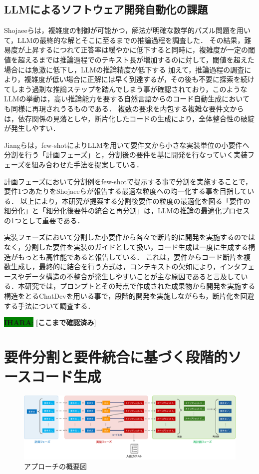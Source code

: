 \documentclass[submit,techrep,noauthor]{ipsj}
\newcommand{\ihara}[1]{\colorbox{green}{{\bf IHARA}:}{\color{blue} {\textbf{[#1]}}}}
\begin{document}
\subsection{LLMによるソフトウェア開発自動化の課題}
Shojaeeら\cite{IllusionApple}は，複雑度の制御が可能かつ，解法が明確な数学的パズル問題を用いて，LLMの最終的な解とそこに至るまでの推論過程を調査した．
その結果，難易度が上昇するにつれて正答率は緩やかに低下すると同時に，複雑度が一定の閾値を超えるまでは推論過程でのテキスト長が増加するのに対して，閾値を超えた場合には急激に低下し，LLMの推論精度が低下する
加えて，推論過程の調査により，複雑度が低い場合に正解には早く到達するが，その後も不要に探索を続けてしまう過剰な推論ステップを踏んでしまう事が確認されており，このようなLLMの挙動は，高い推論能力を要する自然言語からのコード自動生成においても同様に再現されうるものである．
複数の要求を内包する複雑な要件文からは，依存関係の見落としや，断片化したコードの生成により，全体整合性の破綻が発生しやすい．

Jiangら\cite{tosem}は，few-shotによりLLMを用いて要件文から小さな実装単位の小要件へ分割を行う「計画フェーズ」と，分割後の要件を基に開発を行なっていく実装フェーズを組み合わせた手法を提案している．

計画フェーズにおいて分割例をfew-shotで提示する事で分割を実施することで，要件1つあたりをShojaeeらが報告する最適な粒度への均一化する事を目指している．
以上により，本研究が提案する分割後要件の粒度の最適化を図る「要件の細分化」と「細分化後要件の統合と再分割」は，LLMの推論の最適化プロセスの1つとして重要である．

実装フェーズにおいて分割した小要件から各々で断片的に開発を実施するのではなく，分割した要件を実装のガイドとして扱い，コード生成は一度に生成する構造がもっとも高性能であると報告している．
これは，要件からコード断片を複数生成し，最終的に結合を行う方式は，コンテキストの欠如により，インタフェースやデータ構造の不整合が発生しやすいことが主な原因であると言及している．本研究では，プロンプトとその時点で作成された成果物から開発を実施する構造をとるChatDevを用いる事で，段階的開発を実施しながらも，断片化を回避する手法について調査する．


\ihara{ここまで確認済み}

\section{要件分割と要件統合に基づく段階的ソースコード生成}
\label{sec:method}

\begin{figure}[t]
    \centering
    \includegraphics[width=1.0\linewidth]{./Toyoshima_fig/approach_abst_v3.pdf}
    \caption{アプローチの概要図}
    \label{approach_abst}
\end{figure}
\end{document}
